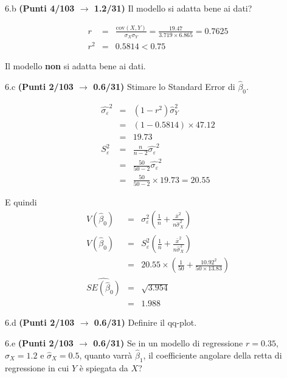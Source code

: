 \documentclass[
  11pt,
]{book}
\theoremstyle{mytheoremstyle}
\theoremstyle{mydefstyle}
\newenvironment{sol}
  {
  \begin{tcolorbox}[enhanced,breakable,arc=0.1mm,boxrule=1pt,colback=white,colframe=iblue,
  title=\bf \fontfamily{lmss}\selectfont \hspace{.5 cm} Soluzione,drop fuzzy shadow]

}{
\end{tcolorbox}
  }
\begin{document}
6.b \textbf{(Punti 4/103 \(\rightarrow\) 1.2/31)} Il modello si adatta bene ai dati?

\begin{sol}
\begin{eqnarray*}
r&=&\frac{\text{cov}(X,Y)}{\sigma_X\sigma_Y}=\frac{ 19.47 }{ 3.719 \times 6.865 }= 0.7625 \\ 
r^2&=& 0.5814 < 0.75
\end{eqnarray*}

Il modello \textbf{non} si adatta bene ai dati.

\end{sol}

6.c \textbf{(Punti 2/103 \(\rightarrow\) 0.6/31)} Stimare lo Standard Error di \(\hat\beta_0\).

\begin{sol}
\begin{eqnarray*}
\hat{\sigma_\varepsilon}^2&=&(1-r^2)\hat\sigma_Y^2\\
&=& (1- 0.5814 )\times 47.12 \\
   &=&  19.73 \\
   S_\varepsilon^2 &=& \frac{n} {n-2} \hat{\sigma_\varepsilon}^2\\
   &=&  \frac{ 50 } { 50 -2} \hat{\sigma_\varepsilon}^2 \\
 &=&  \frac{ 50 } { 50 -2} \times  19.73  =  20.55  
\end{eqnarray*}

E quindi\begin{eqnarray*}
V(\hat\beta_{0}) &=& \sigma_{\varepsilon}^{2} \left( \frac{1} {n}  +  \frac{\bar{x}^{2}} {n \hat{\sigma}^{2}_{X}} \right)\\
\widehat{V(\hat\beta_{0})} &=& S_{\varepsilon}^{2}\left( \frac{1} {n}  +  \frac{\bar{x}^{2}} {n \hat{\sigma}^{2}_{X}} \right)\ \\
 &=&  20.55 \times\left( \frac{1} { 50 }  +  \frac{ 10.92 ^{2}} { 50 \times  13.83 } \right)\\
 \widehat{SE(\hat\beta_{0})}        &=&  \sqrt{ 3.954 }\\
 &=&  1.988 
\end{eqnarray*}

\end{sol}

6.d \textbf{(Punti 2/103 \(\rightarrow\) 0.6/31)} Definire il qq-plot.

6.e \textbf{(Punti 2/103 \(\rightarrow\) 0.6/31)} Se in un modello di regressione \(r=0.35\), \(\hat\sigma_X=1.2\) e \(\hat\sigma_X=0.5\), quanto varrà
\(\hat\beta_1\), il coefficiente angolare della retta di regressione in cui \(Y\) è spiegata da \(X\)?
\end{document}
